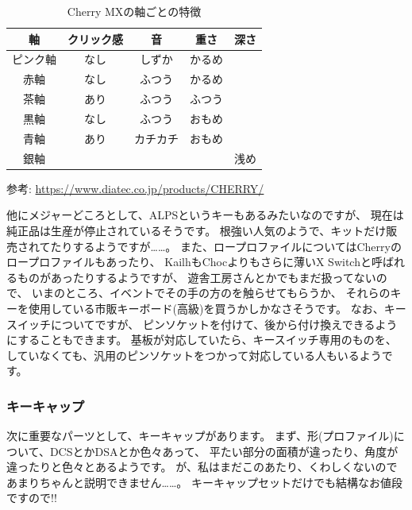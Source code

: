 \documentclass[mingoth,a4paper]{jsarticle}
\begin{document}
\begin{table}[htbp]
 \begin{center}
  \caption{Cherry MXの軸ごとの特徴}
  \label{tab:cherry-jiku}
  \footnotesize
  \begin{tabular}[tb]{c|cccc}
   \hline
   軸       & クリック感 & 音       & 重さ   & 深さ \\ \hline \hline
   ピンク軸 & なし       & しずか   & かるめ\\
   赤軸     & なし       & ふつう   & かるめ\\
   茶軸     & あり       & ふつう   & ふつう\\
   黒軸     & なし       & ふつう   & おもめ \\
   青軸     & あり       & カチカチ & おもめ \\
   銀軸     &            &          &        & 浅め \\ \hline
  \end{tabular}
 \end{center}
 \begin{flushright}
  {\footnotesize 参考: \url{https://www.diatec.co.jp/products/CHERRY/}}
 \end{flushright}
\end{table}

他にメジャーどころとして、ALPSというキーもあるみたいなのですが、
現在は純正品は生産が停止されているそうです。
根強い人気のようで、キットだけ販売されてたりするようですが……。
また、ロープロファイルについてはCherryのロープロファイルもあったり、
KailhもChocよりもさらに薄いX Switchと呼ばれるものがあったりするようですが、
遊舎工房さんとかでもまだ扱ってないので、
いまのところ、イベントでその手の方のを触らせてもらうか、
それらのキーを使用している市販キーボード(高級)を買うかしかなさそうです。
なお、キースイッチについてですが、
ピンソケットを付けて、後から付け換えできるようにすることもできます。
基板が対応していたら、キースイッチ専用のものを、
していなくても、汎用のピンソケットをつかって対応している人もいるようです。

\subsubsection*{キーキャップ}

次に重要なパーツとして、キーキャップがあります。
まず、形(プロファイル)について、DCSとかDSAとか色々あって、
平たい部分の面積が違ったり、角度が違ったりと色々とあるようです。
が、私はまだこのあたり、くわしくないのであまりちゃんと説明できません……。
キーキャップセットだけでも結構なお値段ですので!!
\end{document}
